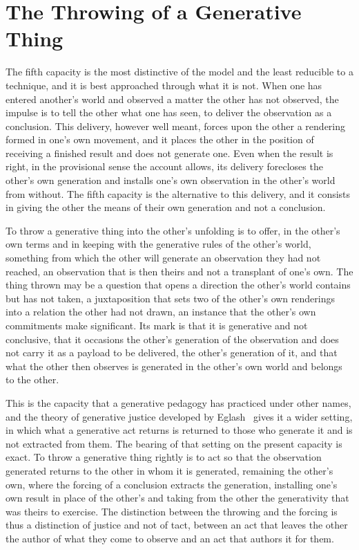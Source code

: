 \section{The Throwing of a Generative Thing}
\label{p27:sec:throwing}

\noindent
The fifth capacity is the most distinctive of the model and the least reducible to a technique, and it is best approached through what it is not. When one has entered another's world and observed a matter the other has not observed, the impulse is to tell the other what one has seen, to deliver the observation as a conclusion. This delivery, however well meant, forces upon the other a rendering formed in one's own movement, and it places the other in the position of receiving a finished result and does not generate one. Even when the result is right, in the provisional sense the account allows, its delivery forecloses the other's own generation and installs one's own observation in the other's world from without. The fifth capacity is the alternative to this delivery, and it consists in giving the other the means of their own generation and not a conclusion.

To throw a generative thing into the other's unfolding is to offer, in the other's own terms and in keeping with the generative rules of the other's world, something from which the other will generate an observation they had not reached, an observation that is then theirs and not a transplant of one's own. The thing thrown may be a question that opens a direction the other's world contains but has not taken, a juxtaposition that sets two of the other's own renderings into a relation the other had not drawn, an instance that the other's own commitments make significant. Its mark is that it is generative and not conclusive, that it occasions the other's generation of the observation and does not carry it as a payload to be delivered, the other's generation of it, and that what the other then observes is generated in the other's own world and belongs to the other.

This is the capacity that a generative pedagogy has practiced under other names, and the theory of generative justice developed by Eglash~\parencite{eglash2016generative} gives it a wider setting, in which what a generative act returns is returned to those who generate it and is not extracted from them. The bearing of that setting on the present capacity is exact. To throw a generative thing rightly is to act so that the observation generated returns to the other in whom it is generated, remaining the other's own, where the forcing of a conclusion extracts the generation, installing one's own result in place of the other's and taking from the other the generativity that was theirs to exercise. The distinction between the throwing and the forcing is thus a distinction of justice and not of tact, between an act that leaves the other the author of what they come to observe and an act that authors it for them.

